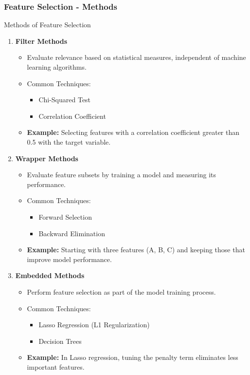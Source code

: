 \documentclass[aspectratio=169]{beamer}
\begin{document}
\begin{frame}[fragile]
    \frametitle{Feature Selection - Methods}
    \begin{block}{Methods of Feature Selection}
        \begin{enumerate}
            \item \textbf{Filter Methods}
            \begin{itemize}
                \item Evaluate relevance based on statistical measures, independent of machine learning algorithms.
                \item Common Techniques: 
                \begin{itemize}
                    \item Chi-Squared Test
                    \item Correlation Coefficient
                \end{itemize}
                \item \textbf{Example:} Selecting features with a correlation coefficient greater than 0.5 with the target variable.
            \end{itemize}
            
            \item \textbf{Wrapper Methods}
            \begin{itemize}
                \item Evaluate feature subsets by training a model and measuring its performance.
                \item Common Techniques: 
                \begin{itemize}
                    \item Forward Selection
                    \item Backward Elimination
                \end{itemize}
                \item \textbf{Example:} Starting with three features (A, B, C) and keeping those that improve model performance.
            \end{itemize}
            
            \item \textbf{Embedded Methods}
            \begin{itemize}
                \item Perform feature selection as part of the model training process.
                \item Common Techniques: 
                \begin{itemize}
                    \item Lasso Regression (L1 Regularization)
                    \item Decision Trees
                \end{itemize}
                \item \textbf{Example:} In Lasso regression, tuning the penalty term eliminates less important features.
            \end{itemize}
        \end{enumerate}
    \end{block}
\end{frame}
\end{document}
